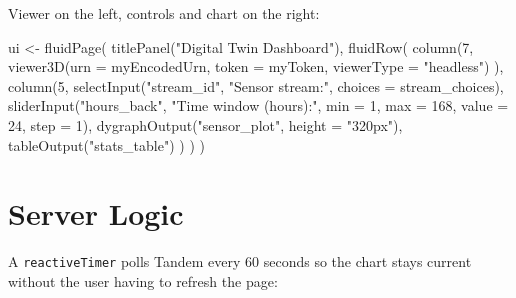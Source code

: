 \documentclass[
  11pt,
  letterpaper,
  DIV=11,
  numbers=noendperiod]{scrreprt}
\newenvironment{Shaded}{\begin{snugshade}}{\end{snugshade}}
\newcommand{\AttributeTok}[1]{\textcolor[rgb]{0.40,0.45,0.13}{#1}}
\newcommand{\DecValTok}[1]{\textcolor[rgb]{0.68,0.00,0.00}{#1}}
\newcommand{\FunctionTok}[1]{\textcolor[rgb]{0.28,0.35,0.67}{#1}}
\newcommand{\NormalTok}[1]{\textcolor[rgb]{0.00,0.23,0.31}{#1}}
\newcommand{\OtherTok}[1]{\textcolor[rgb]{0.00,0.23,0.31}{#1}}
\newcommand{\StringTok}[1]{\textcolor[rgb]{0.13,0.47,0.30}{#1}}
\begin{document}
Viewer on the left, controls and chart on the right:

\begin{Shaded}
\begin{Highlighting}[]
\NormalTok{ui }\OtherTok{\textless{}{-}} \FunctionTok{fluidPage}\NormalTok{(}
  \FunctionTok{titlePanel}\NormalTok{(}\StringTok{"Digital Twin Dashboard"}\NormalTok{),}
  \FunctionTok{fluidRow}\NormalTok{(}
    \FunctionTok{column}\NormalTok{(}\DecValTok{7}\NormalTok{,}
      \FunctionTok{viewer3D}\NormalTok{(}\AttributeTok{urn        =}\NormalTok{ myEncodedUrn,}
               \AttributeTok{token      =}\NormalTok{ myToken,}
               \AttributeTok{viewerType =} \StringTok{"headless"}\NormalTok{)}
\NormalTok{    ),}
    \FunctionTok{column}\NormalTok{(}\DecValTok{5}\NormalTok{,}
      \FunctionTok{selectInput}\NormalTok{(}\StringTok{"stream\_id"}\NormalTok{, }\StringTok{"Sensor stream:"}\NormalTok{,}
                  \AttributeTok{choices =}\NormalTok{ stream\_choices),}
      \FunctionTok{sliderInput}\NormalTok{(}\StringTok{"hours\_back"}\NormalTok{, }\StringTok{"Time window (hours):"}\NormalTok{,}
                  \AttributeTok{min =} \DecValTok{1}\NormalTok{, }\AttributeTok{max =} \DecValTok{168}\NormalTok{, }\AttributeTok{value =} \DecValTok{24}\NormalTok{, }\AttributeTok{step =} \DecValTok{1}\NormalTok{),}
      \FunctionTok{dygraphOutput}\NormalTok{(}\StringTok{"sensor\_plot"}\NormalTok{, }\AttributeTok{height =} \StringTok{"320px"}\NormalTok{),}
      \FunctionTok{tableOutput}\NormalTok{(}\StringTok{"stats\_table"}\NormalTok{)}
\NormalTok{    )}
\NormalTok{  )}
\NormalTok{)}
\end{Highlighting}
\end{Shaded}

\section{Server Logic}\label{server-logic}

A \texttt{reactiveTimer} polls Tandem every 60 seconds so the chart
stays current without the user having to refresh the page:
\end{document}
